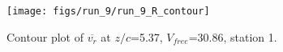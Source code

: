 \begin{figure}[H]
\centering
\texttt{[image: figs/run\_9/run\_9\_R\_contour]}
\caption{Contour plot of $\overline{v_{r}}$ at $z/c$=5.37, $V_{free}$=30.86, station 1.}
\label{fig:run_9_R_contour}
\end{figure}


